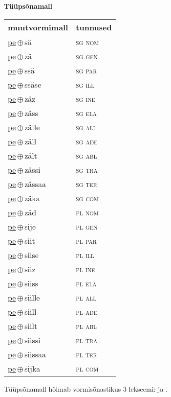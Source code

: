 

\vspace{3.5em}
\noindent \begin{minipage}{\textwidth}
\noindent \textbf{Tüüpsõnamall \,}\\

\begin{sideways}
\begin{tabular}{l l}
muutvormimall & tunnused \\
\hline
\underline{pe}\,$\oplus$\,sä & \textsc{ sg nom } \\
\underline{pe}\,$\oplus$\,zä & \textsc{ sg gen } \\
\underline{pe}\,$\oplus$\,ssä & \textsc{ sg par } \\
\underline{pe}\,$\oplus$\,ssäse & \textsc{ sg ill } \\
\underline{pe}\,$\oplus$\,zäz & \textsc{ sg ine } \\
\underline{pe}\,$\oplus$\,zäss & \textsc{ sg ela } \\
\underline{pe}\,$\oplus$\,zälle & \textsc{ sg all } \\
\underline{pe}\,$\oplus$\,zäll & \textsc{ sg ade } \\
\underline{pe}\,$\oplus$\,zält & \textsc{ sg abl } \\
\underline{pe}\,$\oplus$\,zässi & \textsc{ sg tra } \\
\underline{pe}\,$\oplus$\,zässaa & \textsc{ sg ter } \\
\underline{pe}\,$\oplus$\,zäka & \textsc{ sg com } \\
\underline{pe}\,$\oplus$\,zäd & \textsc{ pl nom } \\
\underline{pe}\,$\oplus$\,sije & \textsc{ pl gen } \\
\underline{pe}\,$\oplus$\,siit & \textsc{ pl par } \\
\underline{pe}\,$\oplus$\,siise & \textsc{ pl ill } \\
\underline{pe}\,$\oplus$\,siiz & \textsc{ pl ine } \\
\underline{pe}\,$\oplus$\,siiss & \textsc{ pl ela } \\
\underline{pe}\,$\oplus$\,siille & \textsc{ pl all } \\
\underline{pe}\,$\oplus$\,siill & \textsc{ pl ade } \\
\underline{pe}\,$\oplus$\,siilt & \textsc{ pl abl } \\
\underline{pe}\,$\oplus$\,siissi & \textsc{ pl tra } \\
\underline{pe}\,$\oplus$\,siissaa & \textsc{ pl ter } \\
\underline{pe}\,$\oplus$\,sijka & \textsc{ pl com } \\
\end{tabular}
\end{sideways}
\label{tab:tüüpsõnamall-pesä}

\end{minipage}

 
\vspace{1em}
\noindent Tüüpsõnamall  hõlmab vormisõnastikus 3 lekseemi:  ja .
